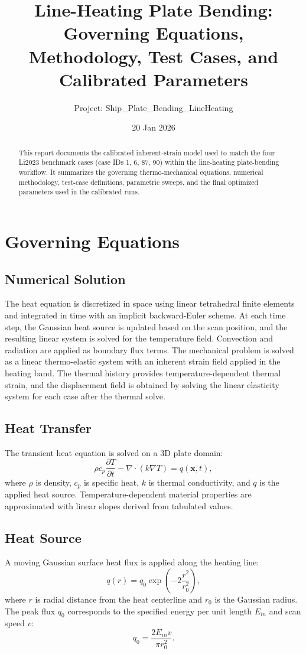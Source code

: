 \documentclass[11pt]{article}
\title{Line-Heating Plate Bending: Governing Equations, Methodology, Test Cases, and Calibrated Parameters}
\author{Project: Ship\_Plate\_Bending\_LineHeating}
\date{20 Jan 2026}
\begin{document}
\maketitle

\begin{abstract}
This report documents the calibrated inherent-strain model used to match the four Li2023 benchmark cases
(case IDs 1, 6, 87, 90) within the line-heating plate-bending workflow. It summarizes the governing
thermo-mechanical equations, numerical methodology, test-case definitions, parametric sweeps, and the
final optimized parameters used in the calibrated runs.
\end{abstract}

\section{Governing Equations}
\subsection{Numerical Solution}
The heat equation is discretized in space using linear tetrahedral finite elements and integrated
in time with an implicit backward-Euler scheme. At each time step, the Gaussian heat source is
updated based on the scan position, and the resulting linear system is solved for the temperature
field. Convection and radiation are applied as boundary flux terms. The mechanical problem is
solved as a linear thermo-elastic system with an inherent strain field applied in the heating
band. The thermal history provides temperature-dependent thermal strain, and the displacement
field is obtained by solving the linear elasticity system for each case after the thermal solve.

\subsection{Heat Transfer}
The transient heat equation is solved on a 3D plate domain:
\begin{equation}
\rho c_p \frac{\partial T}{\partial t} - \nabla \cdot (k \nabla T) = q(\mathbf{x}, t),
\end{equation}
where $\rho$ is density, $c_p$ is specific heat, $k$ is thermal conductivity, and $q$ is the applied heat
source. Temperature-dependent material properties are approximated with linear slopes derived from tabulated
values.

\subsection{Heat Source}
A moving Gaussian surface heat flux is applied along the heating line:
\begin{equation}
q(r) = q_0 \exp\left(-2\frac{r^2}{r_0^2}\right),
\end{equation}
where $r$ is radial distance from the heat centerline and $r_0$ is the Gaussian radius. The peak flux $q_0$
corresponds to the specified energy per unit length $E_{in}$ and scan speed $v$:
\begin{equation}
q_0 = \frac{2 E_{in} v}{\pi r_0^2}.
\end{equation}
\end{document}
